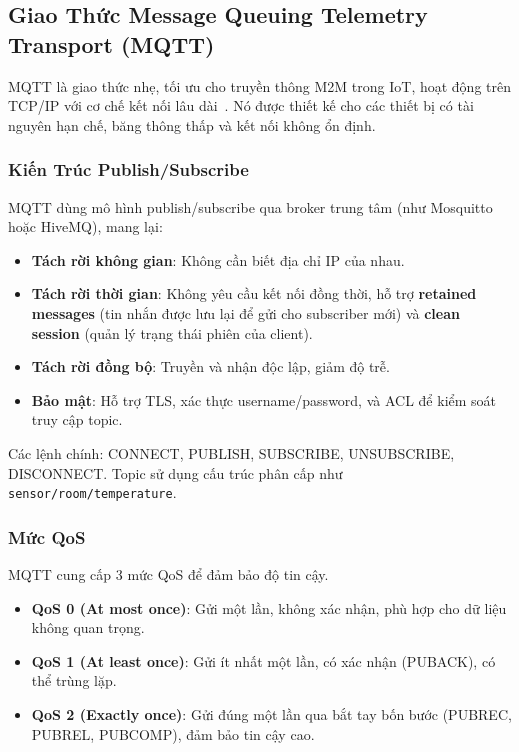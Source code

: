 \subsection{Giao Thức Message Queuing Telemetry Transport (MQTT)}
\label{subsec:mqtt_protocol}

MQTT là giao thức nhẹ, tối ưu cho truyền thông M2M trong IoT, hoạt động trên TCP/IP với cơ chế kết nối lâu dài~\cite{mqtt_oasis_standard}. Nó được thiết kế cho các thiết bị có tài nguyên hạn chế, băng thông thấp và kết nối không ổn định.

\subsubsection{Kiến Trúc Publish/Subscribe}
\label{subsubsec:mqtt_pubsub}

MQTT dùng mô hình publish/subscribe qua broker trung tâm (như Mosquitto hoặc HiveMQ), mang lại:
\begin{itemize}
\item \textbf{Tách rời không gian}: Không cần biết địa chỉ IP của nhau.
\item \textbf{Tách rời thời gian}: Không yêu cầu kết nối đồng thời, hỗ trợ \textbf{retained messages} (tin nhắn được lưu lại để gửi cho subscriber mới) và \textbf{clean session} (quản lý trạng thái phiên của client).
\item \textbf{Tách rời đồng bộ}: Truyền và nhận độc lập, giảm độ trễ.
\item \textbf{Bảo mật}: Hỗ trợ TLS, xác thực username/password, và ACL để kiểm soát truy cập topic.
\end{itemize}

Các lệnh chính: CONNECT, PUBLISH, SUBSCRIBE, UNSUBSCRIBE, DISCONNECT. Topic sử dụng cấu trúc phân cấp như \texttt{sensor/room/temperature}.

\subsubsection{Mức QoS}
\label{subsubsec:mqtt_qos}

MQTT cung cấp 3 mức QoS để đảm bảo độ tin cậy.

\begin{itemize}
\item \textbf{QoS 0 (At most once)}: Gửi một lần, không xác nhận, phù hợp cho dữ liệu không quan trọng.
\item \textbf{QoS 1 (At least once)}: Gửi ít nhất một lần, có xác nhận (PUBACK), có thể trùng lặp.
\item \textbf{QoS 2 (Exactly once)}: Gửi đúng một lần qua bắt tay bốn bước (PUBREC, PUBREL, PUBCOMP), đảm bảo tin cậy cao.
\end{itemize}

